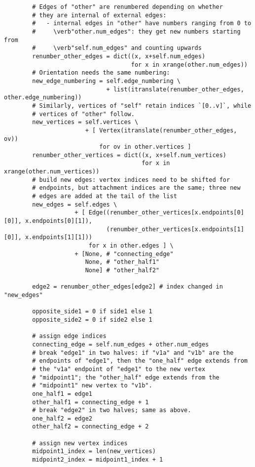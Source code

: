 \begin{lstlisting}
        # Edges of "other" are renumbered depending on whether
        # they are internal of external edges:
        #   - internal edges in "other" have numbers ranging from 0 to
        #     \verb"other.num_edges": they get new numbers starting from
        #     \verb"self.num_edges" and counting upwards
        renumber_other_edges = dict((x, x+self.num_edges)
                                    for x in xrange(other.num_edges))
        # Orientation needs the same numbering:
        new_edge_numbering = self.edge_numbering \
                             + list(itranslate(renumber_other_edges, other.edge_numbering))
        # Similarly, vertices of "self" retain indices `[0..v]`, while
        # vertices of "other" follow.
        new_vertices = self.vertices \
                       + [ Vertex(itranslate(renumber_other_edges, ov))
                           for ov in other.vertices ]
        renumber_other_vertices = dict((x, x+self.num_vertices)
                                       for x in xrange(other.num_vertices))
        # build new edges: vertex indices need to be shifted for
        # endpoints, but attachment indices are the same; three new
        # edges are added at the tail of the list
        new_edges = self.edges \
                    + [ Edge((renumber_other_vertices[x.endpoints[0][0]], x.endpoints[0][1]),
                             (renumber_other_vertices[x.endpoints[1][0]], x.endpoints[1][1]))
                        for x in other.edges ] \
                    + [None, # "connecting_edge"
                       None, # "other_half1"
                       None] # "other_half2"

        edge2 = renumber_other_edges[edge2] # index changed in "new_edges"
        
        opposite_side1 = 0 if side1 else 1
        opposite_side2 = 0 if side2 else 1

        # assign edge indices
        connecting_edge = self.num_edges + other.num_edges
        # break "edge1" in two halves: if "v1a" and "v1b" are the
        # endpoints of "edge1", then the "one_half" edge extends from
        # the "v1a" endpoint of "edge1" to the new vertex
        # "midpoint1"; the "other_half" edge extends from the
        # "midpoint1" new vertex to "v1b".
        one_half1 = edge1
        other_half1 = connecting_edge + 1
        # break "edge2" in two halves; same as above.
        one_half2 = edge2
        other_half2 = connecting_edge + 2

        # assign new vertex indices
        midpoint1_index = len(new_vertices)
        midpoint2_index = midpoint1_index + 1


\end{lstlisting}
